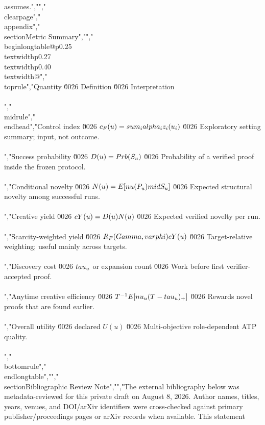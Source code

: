 {{{assumes.","","\\clearpage","\\appendix","\\section{Metric Summary}","","\\begin{longtable}{@{}p{0.25\\textwidth}p{0.27\\textwidth}p{0.40\\textwidth}@{}}","\\toprule","Quantity \u0026 Definition \u0026 Interpretation\\\\","\\midrule","\\endhead","Control index \u0026 $c_F(u)=\\sum_i\\alpha_i z_i(u_i)$ \u0026 Exploratory setting summary; input, not outcome.\\\\","Success probability \u0026 $D(u)=\\Prb(S_u)$ \u0026 Probability of a verified proof inside the frozen protocol.\\\\","Conditional novelty \u0026 $N(u)=\\E[\\nu(P_u)\\mid S_u]$ \u0026 Expected structural novelty among successful runs.\\\\","Creative yield \u0026 $\\cY(u)=D(u)N(u)$ \u0026 Expected verified novelty per run.\\\\","Scarcity-weighted yield \u0026 $R_F(\\Gamma,\\varphi)\\cY(u)$ \u0026 Target-relative weighting; useful mainly across targets.\\\\","Discovery cost \u0026 $\\tau_u$ or expansion count \u0026 Work before first verifier-accepted proof.\\\\","Anytime creative efficiency \u0026 $T^{-1}\\E[\\nu_u(T-\\tau_u)_+]$ \u0026 Rewards novel proofs that are found earlier.\\\\","Overall utility \u0026 declared $U(u)$ \u0026 Multi-objective role-dependent ATP quality.\\\\","\\bottomrule","\\end{longtable}","","\\section{Bibliographic Review Note}","","The external bibliography below was metadata-reviewed for this private draft on August 8, 2026. Author names, titles, years, venues, and DOI/arXiv identifiers were cross-checked against primary publisher/proceedings pages or arXiv records when available. This statement }}}
